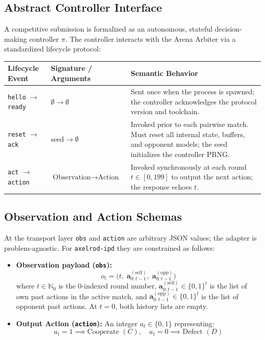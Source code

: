 \documentclass[11pt,a4paper]{article}
\begin{document}
\subsection{Abstract Controller Interface}
A competitive submission is formalized as an autonomous, stateful decision-making controller $\pi$. The controller interacts with the Arena Arbiter via a standardized lifecycle protocol:

\begin{center}
\begin{tabularx}{\textwidth}{llX}
\toprule
\textbf{Lifecycle Event} & \textbf{Signature / Arguments} & \textbf{Semantic Behavior} \\
\midrule
\texttt{hello} $\to$ \texttt{ready} & $\emptyset \to \emptyset$ & Sent once when the process is spawned; the controller acknowledges the protocol version and toolchain. \\
\texttt{reset} $\to$ \texttt{ack} & $\text{seed} \to \emptyset$ & Invoked prior to each pairwise match. Must reset all internal state, buffers, and opponent models; the seed initializes the controller PRNG. \\
\texttt{act} $\to$ \texttt{action} & $\text{Observation} \to \text{Action}$ & Invoked synchronously at each round $t \in [0, 199]$ to output the next action; the response echoes $t$. \\
\bottomrule
\end{tabularx}
\end{center}

\subsection{Observation and Action Schemas}
At the transport layer \texttt{obs} and \texttt{action} are arbitrary JSON values;
the adapter is problem-agnostic. For \texttt{axelrod-ipd} they are constrained as follows:
\begin{itemize}
    \item \textbf{Observation payload (\texttt{obs}):}
    \[
    o_t = \Big( t, \; \mathbf{a}_{0:t-1}^{(\text{self})}, \; \mathbf{a}_{0:t-1}^{(\text{opp})} \Big)
    \]
    where $t \in \mathbb{N}_0$ is the 0-indexed round number, $\mathbf{a}_{0:t-1}^{(\text{self})} \in \{0, 1\}^t$ is the list of own past actions in the active match, and $\mathbf{a}_{0:t-1}^{(\text{opp})} \in \{0, 1\}^t$ is the list of opponent past actions. At $t = 0$, both history lists are empty.
    \item \textbf{Output Action (\texttt{action}):} An integer $a_t \in \{0, 1\}$ representing:
    \[
    a_t = 1 \implies \text{Cooperate } (C), \quad a_t = 0 \implies \text{Defect } (D)
    \]
\end{itemize}
\end{document}
